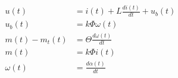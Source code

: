 
\begin{align} 
\label{eq:dc_dt}
u(t) &= i(t) + L\frac{di(t)}{dt} + u_b(t) \\ 
u_b(t) &= k\Phi{}\omega{}(t) \\
m(t) - m_t(t) &= \Theta{}\frac{d\omega{}(t)}{dt} \\
m(t) &= k\Phi{}i(t) \\
\omega{}(t) &= \frac{d\alpha(t)}{dt}
\end{align}
